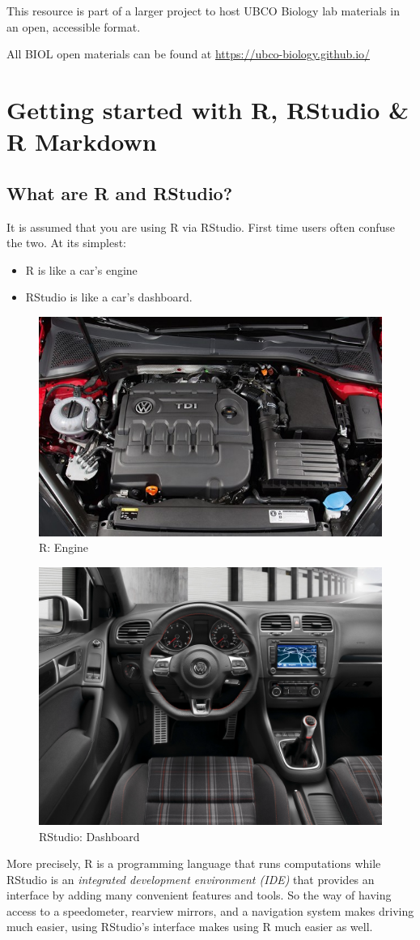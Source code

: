 \documentclass[
]{book}
\providecommand{\tightlist}{%
  \setlength{\itemsep}{0pt}\setlength{\parskip}{0pt}}
\begin{document}
This resource is part of a larger project to host UBCO Biology lab materials in an open, accessible format.

All BIOL open materials can be found at \url{https://ubco-biology.github.io/}

\part*{Getting started with R, RStudio \& R Markdown}\label{part-getting-started-with-r-rstudio-r-markdown}

\chapter{What are R and RStudio?}\label{what_is_R}

It is assumed that you are using R via RStudio. First time users often confuse the two. At its simplest:

\begin{itemize}
\tightlist
\item
  R is like a car's engine
\item
  RStudio is like a car's dashboard.
\end{itemize}

\begin{figure}
\includegraphics[width=0.3\linewidth]{./more/engine} \caption{R: Engine}\label{fig:unnamed-chunk-2}
\end{figure}

\begin{figure}
\includegraphics[width=0.2\linewidth]{./more/dashboard} \caption{RStudio: Dashboard}\label{fig:unnamed-chunk-3}
\end{figure}

More precisely, R is a programming language that runs computations while RStudio is an \emph{integrated development environment (IDE)} that provides an interface by adding many convenient features and tools. So the way of having access to a speedometer, rearview mirrors, and a navigation system makes driving much easier, using RStudio's interface makes using R much easier as well.
\end{document}
